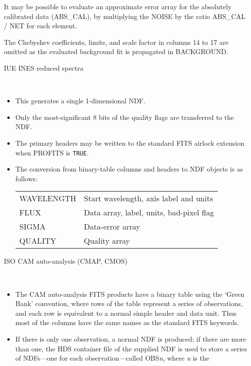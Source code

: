 \documentclass[twoside,11pt]{article}
\newcommand{\htmladdnormallink}[2]{#1}
\newcommand{\latex}[1]{#1}
\newcommand{\ssthitemlist}[1]{
  \latex{
  \mbox{} \\
  \vspace{-3.5ex}
  }
  \begin{itemize}
     #1
  \end{itemize}
}
\newcommand{\sstitem}{\item}
\newcommand{\sstitem}{\item}
\begin{document}
{{{{            \sstitem
            It may be possible to evaluate an approximate error array for
            the absolutely calibrated data (ABS\_CAL), by multiplying the
            NOISE by the ratio ABS\_CAL / NET for each element.
            \sstitem
            The Chebyshev coefficients, limits, and scale factor in
            columns 14 to 17 are omitted as the evaluated background fit is
            propagated in BACKGROUND.
         }
         \bigskip
         \sstitem
         IUE \htmladdnormallink{INES}{http://ines.laeff.esa.es/} reduced spectra
         \ssthitemlist{
            \sstitem
            This generates a single 1-dimensional NDF. 
            \sstitem
            Only the most-significant 8 bits of the quality flags are
            transferred to the NDF.
            \sstitem
            The primary headers may be written to the standard FITS
            airlock extension when PROFITS is \texttt{TRUE}.
            \sstitem
            The conversion from binary-table columns and headers to NDF
            objects is as follows:
            \\[\medskipamount]
            \begin{tabular}{lp{90mm}}
            WAVELENGTH         &   Start wavelength, axis label and units \\
            FLUX               &   Data array, label, units, bad-pixel flag \\
            SIGMA              &   Data-error array \\
            QUALITY            &   Quality array \\
            \end{tabular}
         }
         \bigskip
         \sstitem
         \htmladdnormallink{ISO}{http://www.iso.vilspa.esa.es/users/idc/IDC.html}
         CAM auto-analysis (CMAP, CMOS)
         \ssthitemlist{
            \sstitem
            The CAM auto-analysis FITS products have a binary table
            using the `Green Bank' convention, where rows
            of the table represent a series of observations, and each
            row is equivalent to a normal simple header and data unit.  Thus
            most of the columns have the same names as
            the standard FITS keywords.
            \sstitem
            If there is only one observation, a normal NDF is produced; if
            there are more than one, the HDS container file of the supplied
            NDF is used to store a series of NDFs---one for each
            observation---called OBS\textit{n}, where \textit{n} is the 
}}}}
\end{document}
